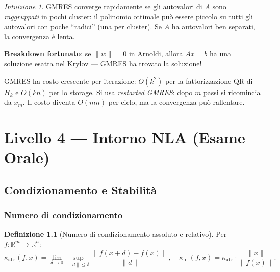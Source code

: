 \documentclass[11pt, a4paper, twoside]{book}
\theoremstyle{definition}
\newtheorem{defn}{Definizione}[chapter]
\theoremstyle{plain}
\theoremstyle{remark}
\newtheorem{intuition}{Intuizione}[chapter]
\newcommand{\R}{\mathbb{R}}
\begin{document}
\begin{intuition}
GMRES converge rapidamente se gli autovalori di $A$ sono \emph{raggruppati} in pochi cluster: il polinomio ottimale può essere piccolo su tutti gli autovalori con poche ``radici'' (una per cluster). Se $A$ ha autovalori ben separati, la convergenza è lenta.

\textbf{Breakdown fortunato}: se $\|w\| = 0$ in Arnoldi, allora $Ax = b$ ha una soluzione esatta nel Krylov — GMRES ha trovato la soluzione!
\end{intuition}

\begin{warningbox}
GMRES ha costo crescente per iterazione: $O(k^2)$ per la fattorizzazione QR di $H_k$ e $O(kn)$ per lo storage. Si usa \emph{restarted GMRES}: dopo $m$ passi si ricomincia da $x_m$. Il costo diventa $O(mn)$ per ciclo, ma la convergenza può rallentare.
\end{warningbox}


\part{Livello 4 --- Intorno NLA (Esame Orale)}
\label{part:L4-nla}

\chapter{Condizionamento e Stabilità}

\section{Numero di condizionamento}
\label{sec:condizionamento}

\begin{defn}[Numero di condizionamento assoluto e relativo]
Per $f: \R^m \to \R^n$:
\[
  \kappa_{\mathrm{abs}}(f, x) = \lim_{\delta \to 0} \sup_{\|d\| \leq \delta} \frac{\|f(x+d) - f(x)\|}{\|d\|}, \quad
  \kappa_{\mathrm{rel}}(f, x) = \kappa_{\mathrm{abs}} \cdot \frac{\|x\|}{\|f(x)\|}.
\]
\end{defn}
\end{document}
